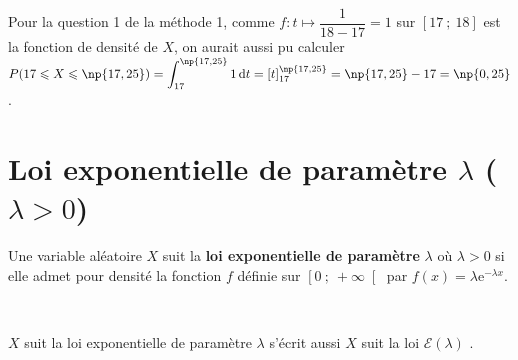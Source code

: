 \documentclass{cornouaille}
\begin{document}
\begin{remarque} 
Pour la question 1 de la méthode 1, comme ${f:t\mapsto \dfrac{1}{18-17}=1}$ sur $\left[17\ ;\ 18 \right]$ est la fonction de densité de $X$, on aurait aussi pu calculer ${P(17\leqslant X \leqslant \np{17,25})=\displaystyle \int_{17}^{\np{17,25}} 1 \, \textrm{d}t=\left[t\right]_{17}^{\np{17,25}}=\np{17,25}-17=\np{0,25}}$.
\end{remarque}

\newpage


\section{Loi exponentielle de paramètre $\lambda$ ($\lambda>0$)}

\begin{definition}
\begin{minipage}{0.5\linewidth}
Une variable aléatoire $X$ suit la \textbf{loi exponentielle de paramètre}{} $\lambda$ où $\lambda>0$ si elle admet pour densité la fonction $f$ définie sur $\left[0\ ;\ +\infty \right[$ par $f(x)=\lambda\textrm{e}^{-\lambda x}$.
\vfill

~~
\end{minipage}
\hfill
\begin{minipage}{0.5\linewidth}
\begin{center}
    \end{center}
\end{minipage}
\end{definition}

\begin{remarque}
\og $X$ suit la loi exponentielle de paramètre $\lambda$ \fg{} s'écrit aussi \og $X$ suit la loi $\mathcal{E}\left(\lambda\right)$ \fg.
\end{remarque}
\end{document}
